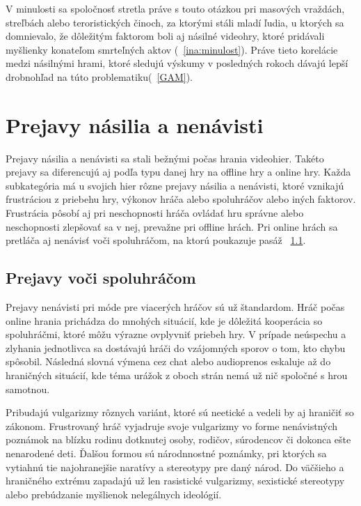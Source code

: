 \documentclass[10pt,twoside,slovak,a4paper]{article}
\begin{document}
V minulosti sa spoločnosť stretla práve s touto otázkou pri masových vraždách, streľbách alebo teroristických činoch, za ktorými stáli mladí ľudia, u ktorých sa domnievalo, že dôležitým faktorom boli aj násilné videohry, ktoré pridávali myšlienky konateľom smrteľných aktov (~\ref{ina:minulost}). Práve tieto korelácie medzi násilnými hrami, ktoré sledujú výskumy v posledných rokoch dávajú lepší drobnohľad na túto problematiku(~\ref{GAM}).




\section{Prejavy násilia a nenávisti} \label{prejavy}

Prejavy násilia a nenávisti sa stali bežnými počas hrania videohier. Takéto prejavy sa diferencujú aj podľa typu danej hry na offline hry a online hry. Každa subkategória má u svojich hier rôzne prejavy násilia a nenávisti, ktoré vznikajú frustráciou z priebehu hry, výkonov hráča alebo spoluhráčov alebo iných faktorov. Frustrácia pôsobí aj pri neschopnosti hráča ovládať hru správne alebo neschopnosti zlepšovať sa v nej\cite{UoR-Failure}, prevažne pri offline hrách. Pri online hrách sa pretláča aj nenávisť voči spoluhráčom, na ktorú poukazuje pasáž ~\ref{ina:spoluhraci}. 


\subsection{Prejavy voči spoluhráčom} \label{ina:spoluhraci}
Prejavy nenávisti pri móde pre viacerých hráčov sú už štandardom. Hráč počas online hrania prichádza do mnohých situácií, kde je dôležitá kooperácia so spoluhráčmi, ktoré môžu výrazne ovplyvniť priebeh hry. V prípade neúspechu a zlyhania jednotlivca sa dostávajú hráči do vzájomných sporov o tom, kto chybu spôsobil. Následná slovná výmena cez chat alebo audioprenos eskaluje až do hraničných situácií, kde téma urážok z oboch strán nemá už nič spoločné s hrou samotnou. 

Pribudajú vulgarizmy rôznych variánt, ktoré sú neetické a vedeli by aj hraničiť so zákonom. Frustrovaný hráč vyjadruje svoje vulgarizmy vo forme nenávistných poznámok na blízku rodinu dotknutej osoby, rodičov, súrodencov či dokonca ešte nenarodené deti. Ďalšou formou sú národnnostné poznámky, pri ktorých sa vytiahnú tie najohranejšie naratívy a stereotypy pre daný národ. Do väčšieho a hraničného extrému zapadajú už len rasistické vulgarizmy, sexistické stereotypy alebo prebúdzanie myšlienok nelegálnych ideológií.
\end{document}
